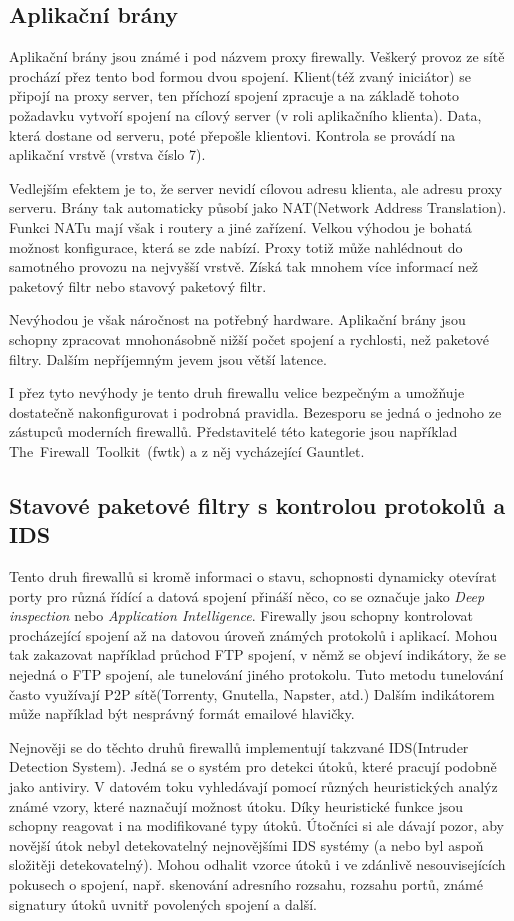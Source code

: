 \documentclass[11pt,twoside,a4paper]{article}
\begin{document}
\subsection{Aplikační brány}
Aplikační brány jsou známé i pod názvem proxy firewally. Veškerý provoz ze sítě prochází přez tento bod formou dvou spojení. Klient(též zvaný iniciátor) se připojí na proxy server, ten příchozí spojení zpracuje a na základě tohoto požadavku vytvoří spojení na cílový server (v roli aplikačního klienta). Data, která dostane od serveru, poté přepošle klientovi. Kontrola se provádí na aplikační vrstvě (vrstva číslo 7).

Vedlejším efektem je to, že server nevidí cílovou adresu klienta, ale adresu proxy serveru. Brány tak automaticky působí jako NAT(Network Address Translation). Funkci NATu mají však i routery a jiné zařízení. Velkou výhodou je bohatá možnost konfigurace, která se zde nabízí. Proxy totiž může nahlédnout do samotného provozu na nejvyšší vrstvě. Získá tak mnohem více informací než paketový filtr nebo stavový paketový filtr.

Nevýhodou je však náročnost na potřebný hardware. Aplikační brány jsou schopny zpracovat mnohonásobně nižší počet spojení a rychlosti, než paketové filtry. Dalším nepříjemným jevem jsou větší latence.  

I přez tyto nevýhody je tento druh firewallu velice bezpečným a umožňuje dostatečně nakonfigurovat i podrobná pravidla. Bezesporu se jedná o jednoho ze zástupců moderních firewallů. Představitelé této kategorie jsou například The~Firewall~Toolkit~(fwtk) a z něj vycházející Gauntlet.

\subsection{Stavové paketové filtry s kontrolou protokolů a IDS}
Tento druh firewallů si kromě informaci o stavu, schopnosti dynamicky otevírat porty pro různá řídící a datová spojení přináší něco, co se označuje jako \textit{Deep inspection} nebo \textit{Application Intelligence}. Firewally jsou schopny kontrolovat procházející spojení až na datovou úroveň známých protokolů i aplikací. Mohou tak zakazovat například průchod FTP spojení, v němž se objeví indikátory, že se nejedná o FTP spojení, ale tunelování jiného protokolu. Tuto metodu tunelování často využívají P2P sítě(Torrenty, Gnutella, Napster, atd.) Dalším indikátorem může například být nesprávný formát emailové hlavičky. 

Nejnověji se do  těchto druhů firewallů implementují takzvané IDS(Intruder Detection System). Jedná se o systém pro detekci útoků, které pracují podobně jako antiviry. V datovém toku vyhledávají pomocí různých heuristických analýz známé vzory, které naznačují možnost útoku. Díky heuristické funkce jsou schopny reagovat i na modifikované typy útoků. Útočníci si ale dávají pozor, aby novější útok nebyl detekovatelný nejnovějšími IDS systémy (a nebo byl aspoň složitěji detekovatelný). Mohou odhalit vzorce útoků i ve zdánlivě nesouvisejících pokusech o spojení, např. skenování adresního rozsahu, rozsahu portů, známé signatury útoků uvnitř povolených spojení a další.
\end{document}
